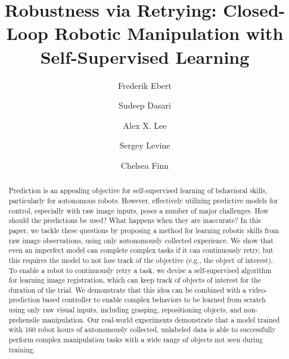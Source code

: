 \documentclass{article}
\title{Robustness via Retrying: Closed-Loop Robotic Manipulation with Self-Supervised Learning}
\author[1]{Frederik Ebert}
\author[1]{Sudeep Dasari}
\author[1]{Alex X. Lee}
\author[1]{Sergey Levine}
\author[1]{Chelsea Finn}
\affil[1]{\footnotesize Department of Electrical Engineering and Computer Sciences, UC Berkeley, United States}
\affil[ ]{\texttt{\{febert,sdasari,alexlee\_gk,svlevine,cbfinn\}@berkeley.edu}}
\begin{document}

\maketitle

\begin{abstract}
Prediction is an appealing objective for self-supervised learning of behavioral skills, particularly for autonomous robots. However, effectively utilizing predictive models for control, especially with raw image inputs, poses a number of major challenges. How should the predictions be used? What happens when they are inaccurate? In this paper, we tackle these questions by proposing a method for learning robotic skills from raw image observations, using only autonomously collected experience. We show that even an imperfect model can complete complex tasks if it can continuously retry, but this requires the model to not lose track of the objective (e.g., the object of interest). To enable a robot to continuously retry a task, we devise a self-supervised algorithm for learning image registration, which can keep track of objects of interest for the duration of the trial. We demonstrate that this idea can be combined with a video-prediction based controller to enable complex behaviors to be learned from scratch using only raw visual inputs, including grasping, repositioning objects, and non-prehensile manipulation. Our real-world experiments demonstrate that a model trained with 160 robot hours of autonomously collected, unlabeled data is able to successfully perform complex manipulation tasks with a wide range of objects not seen during training.

\end{abstract}
\end{document}
